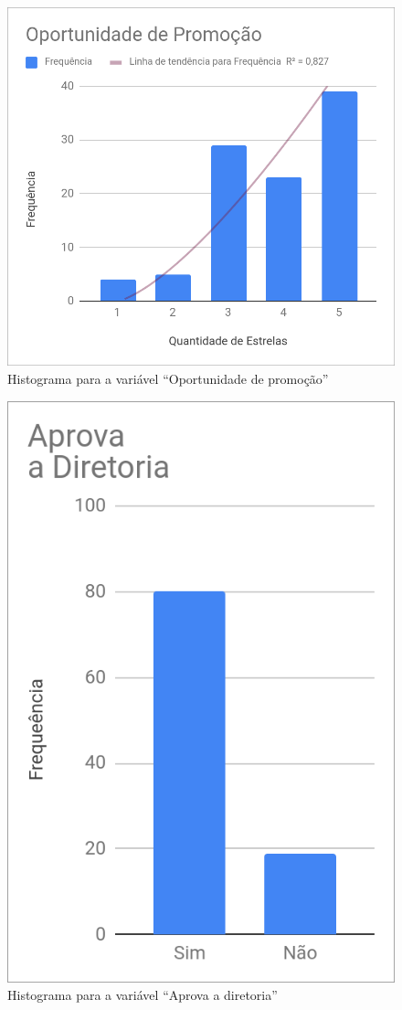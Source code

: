 	\begin{figure}
		\centering
		\caption{Histograma para a variável ``Oportunidade de promoção''}
		\label{fig:promocao}
		\includegraphics[width=1\linewidth]{img/oportunidade_promo}
	\end{figure}
	
	\begin{figure}
		\centering
		\caption{Histograma para a variável ``Aprova a diretoria''}
		\label{fig:diretoria}
		\includegraphics[width=0.5\linewidth]{img/aprova_diretoria}
	\end{figure}

